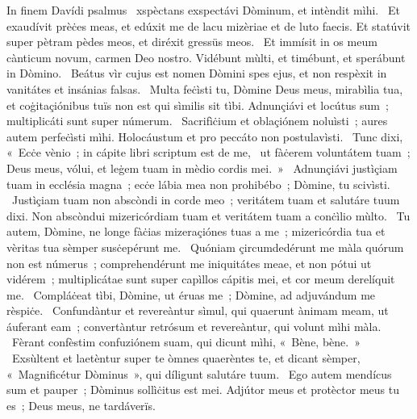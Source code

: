 { In finem Davídi psalmus}
{%
~xspèctans exspectávi Dòminum, et intèndit mìhi. 
~Et exaudívit prèċes meas, et edúxit me de lacu mizèriae et de luto faecis. Et statúvit super pètram pèdes meos, et diréxit gressüs meos. 
~Et immísit in os meum cànticum novum, carmen Deo nostro. Vidébunt mùlti, et timébunt, et sperábunt in Dòmino. 
~Beátus vìr cujus est nomen Dòmini spes ejus, et non respèxit in vanitátes et insánias falsas. 
~Multa feċìsti tu, Dòmine Deus meus, mirabìlia tua, et coġitaçiónibus tuïs non est qui sìmilis sit tìbi. Adnunçiávi et locútus sum~; multiplicáti sunt super númerum. 
~Sacrifìċium et oblaçiónem noluìsti~; aures autem perfeċìsti mìhi. Holocáustum et pro peccáto non postulavìsti. 
~Tunc dixi, «~Ecċe vènio~; in cápite libri scriptum est de me, 
~ut fàċerem voluntátem tuam~; Deus meus, vólui, et leġem tuam in mèdio cordis mei.~»
~Adnunçiávi justìçiam tuam in ecclésia magna~; ecċe lábia mea non prohibébo~; Dòmine, tu scivìsti. 
~Justìçiam tuam non abscòndi in corde meo~; veritátem tuam et salutáre tuum dixi. Non abscòndui mizericórdiam tuam et veritátem tuam a conċìlio mùlto. 
~Tu autem, Dòmine, ne longe fàċias mizeraçiónes tuas a me~; mizericórdia tua et vèritas tua sèmper susċepérunt me. 
~Quóniam çircumdedérunt me màla quórum non est númerus~; comprehendérunt me iniquitátes meae, et non pótui ut vidérem~; multiplicátae sunt super capìllos cápitis mei, et cor meum derelíquit me. 
~Compláċeat tìbi, Dòmine, ut éruas me~; Dòmine, ad adjuvándum me rèspiċe. 
~Confundàntur et revereàntur sìmul, qui quaerunt ànimam meam, ut áuferant eam~; convertàntur retrósum et revereàntur, qui volunt mìhi màla. 
~Fèrant confèstim confuziónem suam, qui dicunt mìhi, «~Bène, bène.~»
~Exsùltent et laetèntur super te òmnes quaerèntes te, et dicant sèmper, «~Magnificétur Dòminus~», qui díligunt salutáre tuum. 
~Ego autem mendícus sum et pauper~; Dòminus sollìċitus est mei. Adjútor meus et protèctor meus tu es~; Deus meus, ne  tardáverïs. 
}
